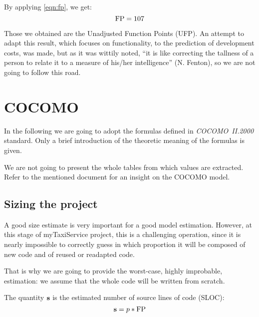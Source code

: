 By applying \cref{eqn:fp}, we get:
\begin{equation}
	\mFP = 107 %
\end{equation}

Those we obtained are the Unadjusted Function Points (UFP). An attempt to adapt this result, which focuses on functionality, to the prediction of development costs, was made, but as it was wittily noted, ``it is like correcting the tallness of a person to relate it to a measure of his/her intelligence'' (N. Fenton), so we are not going to follow this road.























\section{COCOMO}


In the following we are going to adopt the formulas defined in \mbox{\emph{COCOMO II.2000}} standard. Only a brief introduction of the theoretic meaning of the formulas is given. 

We are not going to present the whole tables from which values are extracted. Refer to the mentioned document for an insight on the COCOMO model. 


\subsection{Sizing the project}

A good size estimate is very important for a good model estimation. However, at this stage of myTaxiService project, this is a challenging operation, since it is nearly impossible to correctly guess in which proportion it will be composed of new code and of reused or readapted code.

That is why we are going to provide the \mbox{worst-case}, highly improbable, estimation: we assume that the whole code will be written from scratch. 

The quantity $\mathbf{s}$ is the estimated number of source lines of code (SLOC):
\begin{equation}
%
	\mSize = p * \mFP
%
\end{equation}

